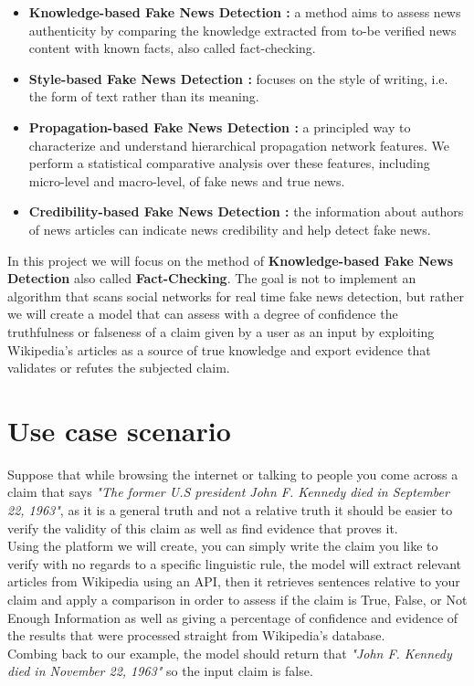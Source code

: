 \documentclass[10pt, english]{report}
\begin{document}
\begin{itemize}
\item \textbf{Knowledge-based Fake News Detection \cite{chernyavskiy2021whatthewikifact}:} a method aims to assess news authenticity by comparing the knowledge extracted from to-be verified news content with known facts, also called fact-checking.
\item \textbf{Style-based Fake News Detection \cite{przybyla2020capturing}:} focuses on the style of writing, i.e. the form of text rather than its meaning.
\item \textbf{Propagation-based Fake News Detection \cite{shu2020hierarchical}:} a principled way to characterize and understand hierarchical propagation network features. We perform a statistical comparative analysis over these features, including micro-level and macro-level, of fake news and true news.
\item \textbf{Credibility-based Fake News Detection \cite{sitaula2020credibility}:} the information about authors of news articles can indicate news credibility and help detect fake news.
\end{itemize}

In this project we will focus on the method of \textbf{Knowledge-based Fake News Detection} also called \textbf{Fact-Checking}. The goal is not to implement an algorithm that scans social networks for real time fake news detection, but rather we will create a model that can assess with a degree of confidence the truthfulness or falseness of a claim given by a user as an input by exploiting Wikipedia's articles \cite{trokhymovychnatural} as a source of true knowledge and export evidence that validates or refutes the subjected claim.

\section{Use case scenario}
Suppose that while browsing the internet or talking to people you come across a claim that says \textit{"The former U.S president John F. Kennedy died in September 22, 1963"}, as it is a general truth and not a relative truth it should be easier to verify the validity of this claim as well as find evidence that proves it.\\
Using the platform we will create, you can simply write the claim you like to verify with no regards to a specific linguistic rule, the model will extract relevant articles from Wikipedia using an API, then it retrieves sentences relative to your claim and apply a comparison in order to assess if the claim is True, False, or Not Enough Information as well as giving a percentage of confidence and evidence of the results that were processed straight from Wikipedia's database.\\
Combing back to our example, the model should return that \textit{"John F. Kennedy died in November 22, 1963"} so the input claim is false.
\end{document}
